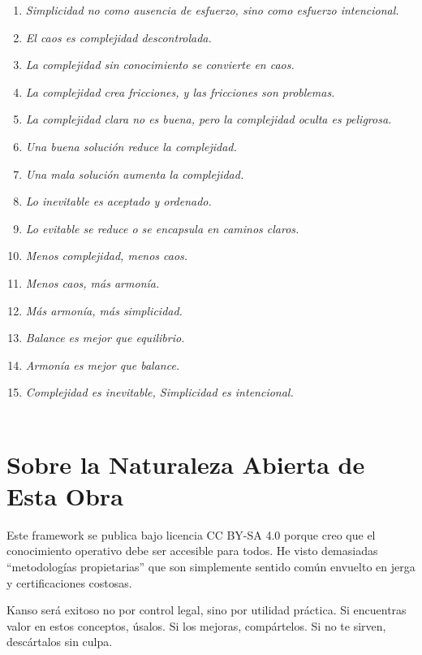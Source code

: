 \begin{enumerate}
    \item \textit{Simplicidad no como ausencia de esfuerzo, sino como esfuerzo intencional.}
    \item \textit{El caos es complejidad descontrolada.}
    \item \textit{La complejidad sin conocimiento se convierte en caos.}
    \item \textit{La complejidad crea fricciones, y las fricciones son problemas.}
    \item \textit{La complejidad clara no es buena, pero la complejidad oculta es peligrosa.}
    \item \textit{Una buena solución reduce la complejidad.}
    \item \textit{Una mala solución aumenta la complejidad.}
    \item \textit{Lo inevitable es aceptado y ordenado.}
    \item \textit{Lo evitable se reduce o se encapsula en caminos claros.}
    \item \textit{Menos complejidad, menos caos.}
    \item \textit{Menos caos, más armonía.}
    \item \textit{Más armonía, más simplicidad.}
    \item \textit{Balance es mejor que equilibrio.}
    \item \textit{Armonía es mejor que balance.}
    \item \textit{Complejidad es inevitable, Simplicidad es intencional.}
\\
\\
\end{enumerate}

\section{Sobre la Naturaleza Abierta de Esta Obra}

Este framework se publica bajo licencia CC BY-SA 4.0 porque creo que el conocimiento operativo debe ser accesible para todos. He visto demasiadas ``metodologías propietarias'' que son simplemente sentido común envuelto en jerga y certificaciones costosas.

Kanso será exitoso no por control legal, sino por utilidad práctica. Si encuentras valor en estos conceptos, úsalos. Si los mejoras, compártelos. Si no te sirven, descártalos sin culpa.

